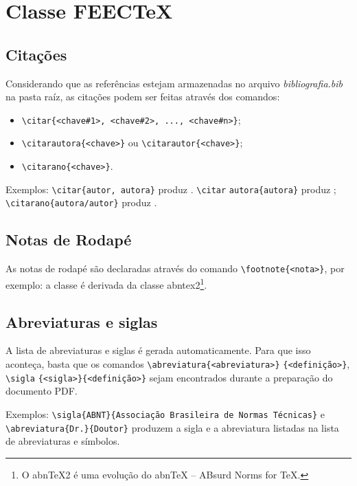 \chapter{Classe FEECTeX}
\label{cap1}

\section{Citações}

Considerando que as referências estejam armazenadas no arquivo \textit{bibliografia.bib} na pasta raíz, as citações podem ser feitas através dos comandos:

\begin{itemize}
    \item \verb|\citar{<chave#1>, <chave#2>, ..., <chave#n>}|;
    \item \verb|\citarautora{<chave>}| ou \verb|\citarautor{<chave>}|;
    \item \verb|\citarano{<chave>}|.
\end{itemize}

\noindent Exemplos: \verb|\citar{autor, autora}| produz . \verb|\citar| \verb|autora{autora}| produz ; \verb|\citarano{autora/autor}| produz .

\section{Notas de Rodapé}

As notas de rodapé são declaradas através do comando \verb|\footnote{<nota>}|, por exemplo: a classe \feectex é derivada da classe abntex2\footnote{O abnTeX2 é uma evolução do abnTeX -- ABsurd Norms for TeX.}.

\section{Abreviaturas e siglas}

A lista de abreviaturas e siglas é gerada automaticamente. Para que isso aconteça, basta que os comandos \verb|\abreviatura{<abreviatura>}| \verb|{<definição>}|, \verb|\sigla| \verb|{<sigla>}{<definição>}| sejam encontrados durante a preparação do documento PDF.

Exemplos: \verb|\sigla{ABNT}{Associação Brasileira de Normas Técnicas}| e \verb|\abreviatura{Dr.}{Doutor}| produzem a sigla e a abreviatura listadas na lista de abreviaturas e símbolos. 

